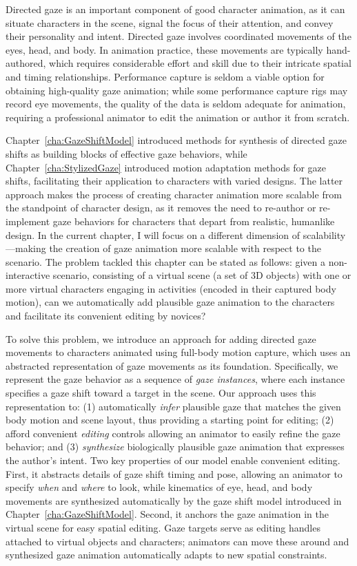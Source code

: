 Directed gaze is an important component of good character animation, as it can situate characters in the scene, signal the focus of their attention, and convey their personality and intent. Directed gaze involves coordinated movements of the eyes, head, and body. In animation practice, these movements are typically hand-authored, which requires considerable effort and skill due to their intricate spatial and timing relationships. Performance capture is seldom a viable option for obtaining high-quality gaze animation; while some performance capture rigs may record eye movements, the quality of the data is seldom adequate for animation, requiring a professional animator to edit the animation or author it from scratch.

Chapter~\ref{cha:GazeShiftModel} introduced methods for synthesis of directed gaze shifts as building blocks of effective gaze behaviors, while Chapter~\ref{cha:StylizedGaze} introduced motion adaptation methods for gaze shifts, facilitating their application to characters with varied designs. The latter approach makes the process of creating character animation more scalable from the standpoint of character design, as it removes the need to re-author or re-implement gaze behaviors for characters that depart from realistic, humanlike design. In the current chapter, I will focus on a different dimension of scalability---making the creation of gaze animation more scalable with respect to the scenario. The problem tackled this chapter can be stated as follows: given a non-interactive scenario, consisting of a virtual scene (a set of 3D objects) with one or more virtual characters engaging in activities (encoded in their captured body motion), can we automatically add plausible gaze animation to the characters and facilitate its convenient editing by novices?

To solve this problem, we introduce an approach for adding directed gaze movements to characters animated using full-body motion capture, which uses an abstracted representation of gaze movements as its foundation. Specifically, we represent the gaze behavior as a sequence of \emph{gaze instances}, where each instance specifies a gaze shift toward a target in the scene. Our approach uses this representation to: (1) automatically \emph{infer} plausible gaze that matches the given body motion and scene layout, thus providing a starting point for editing; (2) afford convenient \emph{editing} controls allowing an animator to easily refine the gaze behavior; and (3) \emph{synthesize} biologically plausible gaze animation that expresses the author's intent. Two key properties of our model enable convenient editing. First, it abstracts details of gaze shift timing and pose, allowing an animator to specify \emph{when} and \emph{where} to look, while kinematics of eye, head, and body movements are synthesized automatically by the gaze shift model introduced in Chapter~\ref{cha:GazeShiftModel}. Second, it anchors the gaze animation in the virtual scene for easy spatial editing. Gaze targets serve as editing handles attached to virtual objects and characters; animators can move these around and synthesized gaze animation automatically adapts to new spatial constraints.


